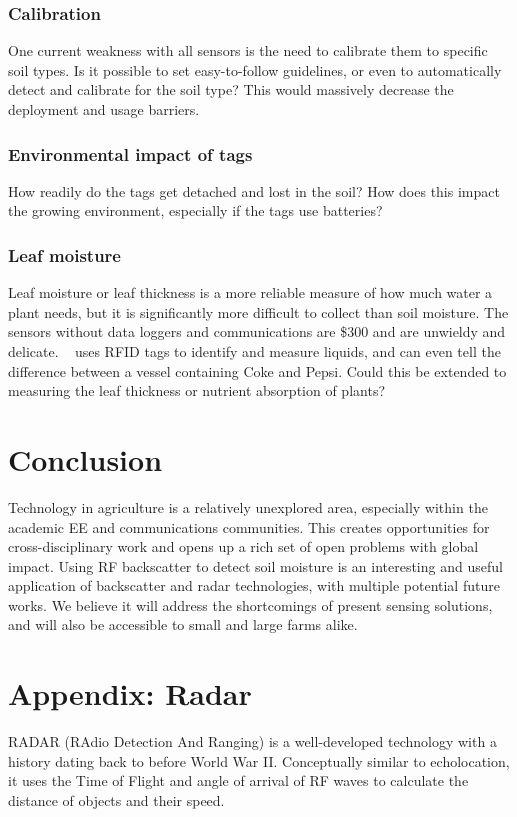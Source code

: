 \documentclass[12pt]{article}
\begin{document}
\subsubsection*{Calibration} One current weakness with all sensors is the
need to calibrate them to specific soil types. Is it possible to set
easy-to-follow guidelines, or even to automatically detect and
calibrate for the soil type? This would massively decrease the
deployment and usage barriers.

\subsubsection*{Environmental impact of tags}
How readily do the tags get detached and lost in the soil? How does
this impact the growing environment, especially if the tags use
batteries?

\subsubsection*{Leaf moisture}
Leaf moisture or leaf thickness is a more reliable measure of how much
water a plant needs, but it is significantly more difficult to collect
than soil moisture. The sensors without data loggers and
communications are \$300 and are unwieldy and
delicate. ~\cite{Wang2017} uses RFID tags to identify and measure
liquids, and can even tell the difference between a vessel containing
Coke and Pepsi. Could this be extended to measuring the leaf thickness
or nutrient absorption of plants?


\section*{Conclusion}
Technology in agriculture is a relatively unexplored area, especially
within the academic EE and communications communities. This creates
opportunities for cross-disciplinary work and opens up a rich set of
open problems with global impact. Using RF backscatter to detect
soil moisture is an interesting and useful application of backscatter
and radar technologies, with multiple potential future works. We
believe it will address the shortcomings of present sensing solutions,
and will also be accessible to small and large farms alike.


\begin{footnotesize}
  
\end{footnotesize}

\section*{Appendix: Radar}
RADAR (RAdio Detection And Ranging) is a well-developed technology
with a history dating back to before World War II. Conceptually
similar to echolocation, it uses the Time of Flight and angle of
arrival of RF waves to calculate the distance of objects and their
speed.
\end{document}
